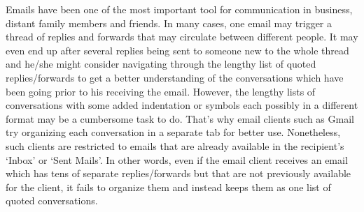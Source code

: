 \documentclass[11pt]{article}
\begin{document}
\begin{figure}[tb]
\end{figure}

Emails have been one of the most important tool for communication in business, distant family members and friends.
In many cases, one email may trigger a thread of replies and forwards that may circulate between different people. It may even
end up after several replies being sent to someone new to the whole thread and he/she might consider navigating through
the lengthy list of quoted replies/forwards to get a better understanding of the conversations which have been going prior to his
receiving the email. However, the lengthy lists of conversations with some added indentation or symbols each possibly in a different
format may be a cumbersome task to do. That's why email clients such as Gmail try organizing each conversation in a separate tab for
better use. Nonetheless, such clients are restricted to emails that are already available in the recipient's `Inbox' or `Sent Mails'.
In other words, even if the email client receives an email which has 
tens of separate replies/forwards but that are not previously available for the client, it 
fails to organize them and instead keeps them as one list of quoted conversations.
\end{document}

